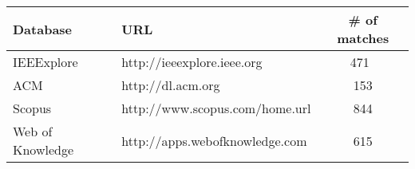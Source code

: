 \begin{center}
\label{databasetable}
\begin{tabular}{l l c }
    \bfseries{Database} & \bfseries{URL} & \bfseries{\# of matches} \\
    \hline
    IEEExplore & http://ieeexplore.ieee.org & 471 \\
    ACM & http://dl.acm.org & 153 \\
    Scopus & http://www.scopus.com/home.url & 844 \\
	Web of Knowledge & http://apps.webofknowledge.com &  615 \\
\end{tabular}
\end{center}
